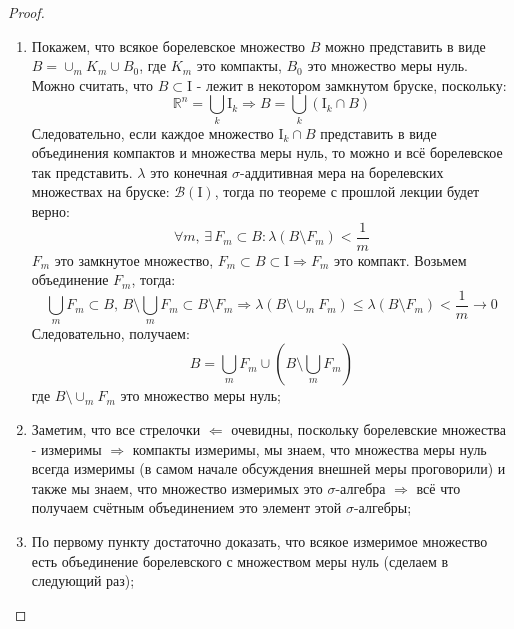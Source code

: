 \documentclass[12pt]{article}
\newcommand{\MR}{\mathbb{R}}
\newcommand{\MI}{\mathrm{I}}
\newcommand{\MB}{\mathcal{B}}
\theoremstyle{definition}
\begin{document}
\begin{proof}\hfill
	\begin{enumerate}[label=\arabic*)]
		\item Покажем, что всякое борелевское множество $B$ можно представить в виде $B = \cup_m K_m \cup B_0$, где $K_m$ это компакты, $B_0$ это множество меры нуль. Можно считать, что $B \subset \MI$ - лежит в некотором замкнутом бруске, поскольку:
		$$
			\MR^n = \bigcup\limits_k \MI_k \Rightarrow B = \bigcup\limits_k (\MI_k \cap B)
		$$
		Следовательно, если каждое множество $\MI_k \cap B$ представить в виде объединения компактов и множества меры нуль, то можно и всё борелевское так представить. $\lambda$ это конечная $\sigma$-аддитивная мера на борелевских множествах на бруске: $\MB(\MI)$, тогда по теореме с прошлой лекции будет верно:
		$$
			\forall m, \, \exists \, F_m \subset B \colon \lambda(B \setminus F_m) < \dfrac{1}{m}
		$$
		$F_m$ это замкнутое множество, $F_m \subset B \subset \MI \Rightarrow F_m$ это компакт. Возьмем объединение $F_m$, тогда:
		$$
			\bigcup\limits_m F_m \subset B , \, B \setminus \bigcup\limits_m F_m \subset B \setminus F_m \Rightarrow \lambda(B \setminus \cup_m F_m) \leq \lambda(B \setminus F_m) < \dfrac{1}{m} \to 0
		$$
		Следовательно, получаем: 
		$$
			B = \bigcup\limits_m F_m \cup \left(B \setminus \bigcup\limits_m F_m\right)
		$$ 
		где $B \setminus \cup_m F_m$ это множество меры нуль;
		\item Заметим, что все стрелочки $\Leftarrow$ очевидны, поскольку борелевские множества - измеримы $\Rightarrow$ компакты измеримы, мы знаем, что множества меры нуль всегда измеримы (в самом начале обсуждения внешней меры проговорили) и также мы знаем, что множество измеримых это $\sigma$-алгебра $\Rightarrow$ всё что получаем счётным объединением это элемент этой $\sigma$-алгебры;
		\item По первому пункту достаточно доказать, что всякое измеримое множество есть объединение борелевского с множеством меры нуль (сделаем в следующий раз);
	\end{enumerate}
\end{proof}
\end{document}
